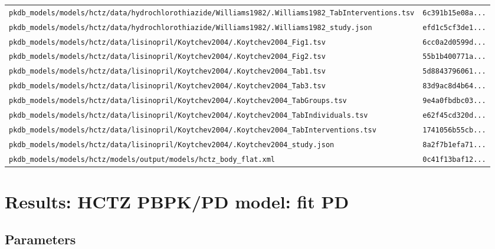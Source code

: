 \begin{longtable}{ll}
\texttt{pkdb\_models/models/hctz/data/hydrochlorothiazide/Williams1982/.Williams1982\_TabInterventions.tsv} & \texttt{6c391b15e08a...} \\
\texttt{pkdb\_models/models/hctz/data/hydrochlorothiazide/Williams1982/.Williams1982\_study.json} & \texttt{efd1c5cf3de1...} \\
\texttt{pkdb\_models/models/hctz/data/lisinopril/Koytchev2004/.Koytchev2004\_Fig1.tsv} & \texttt{6cc0a2d0599d...} \\
\texttt{pkdb\_models/models/hctz/data/lisinopril/Koytchev2004/.Koytchev2004\_Fig2.tsv} & \texttt{55b1b400771a...} \\
\texttt{pkdb\_models/models/hctz/data/lisinopril/Koytchev2004/.Koytchev2004\_Tab1.tsv} & \texttt{5d8843796061...} \\
\texttt{pkdb\_models/models/hctz/data/lisinopril/Koytchev2004/.Koytchev2004\_Tab3.tsv} & \texttt{83d9ac8d4b64...} \\
\texttt{pkdb\_models/models/hctz/data/lisinopril/Koytchev2004/.Koytchev2004\_TabGroups.tsv} & \texttt{9e4a0fbdbc03...} \\
\texttt{pkdb\_models/models/hctz/data/lisinopril/Koytchev2004/.Koytchev2004\_TabIndividuals.tsv} & \texttt{e62f45cd320d...} \\
\texttt{pkdb\_models/models/hctz/data/lisinopril/Koytchev2004/.Koytchev2004\_TabInterventions.tsv} & \texttt{1741056b55cb...} \\
\texttt{pkdb\_models/models/hctz/data/lisinopril/Koytchev2004/.Koytchev2004\_study.json} & \texttt{8a2f7b1efa71...} \\
\texttt{pkdb\_models/models/hctz/models/output/models/hctz\_body\_flat.xml} & \texttt{0c41f13baf12...} \\
\end{longtable}

\section{Results: HCTZ PBPK/PD model: fit PD}

\subsection{Parameters}

